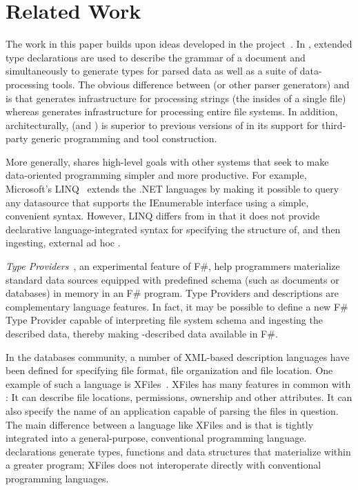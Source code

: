 \section{Related Work}
\label{sec:related}

The work in this paper builds upon ideas developed in the \pads{} 
project~\cite{fisher+:pads,fisher+:toplas}. In \pads{}, extended
type declarations are used to describe the grammar of a document
and simultaneously to generate types for parsed data as well as a suite 
of data-processing tools.  The obvious difference between 
\pads{} (or other parser generators) and
\forest{} is that 
\pads{} generates infrastructure for processing strings (the insides
of a single file) whereas \forest{} generates infrastructure for 
processing entire file systems.
In addition,
architecturally, \forest{} (and \padshaskell) is superior to 
previous versions of \pads{}
in its support for third-party generic programming and tool construction.

More generally, \forest{} shares high-level goals with other systems
that seek to make data-oriented programming simpler and more productive.
For example, Microsoft's LINQ~\cite{linq} extends the .NET languages
by making it possible to query 
any datasource that supports the IEnumerable interface using
a simple, convenient syntax.  However, LINQ
differs from \forest{} in that
it does not provide declarative 
language-integrated syntax for specifying the structure of, and then ingesting,
external ad hoc \filestores{}.

{\em Type Providers}~\cite{syme+:type-providers}, an experimental feature
of F\#, help programmers materialize standard data sources equipped with
predefined schema (such as \xml{} documents or databases) in memory in
an F\# program.  Type Providers and \forest{} descriptions
are complementary language
features.  In fact, it may be possible to define a new F\# Type Provider
capable of interpreting \forest{} file system schema and ingesting
the described data, thereby making \forest{}-described data available
in F\#.

In the databases community, a number of XML-based
description languages have been defined for specifying
file format, file organization and file location.
One example of such a language is XFiles~\cite{xml-file-sys}.
XFiles has many features in common with \forest{}:  It can
describe file locations, permissions, ownership and other
attributes.  It can also specify the name of an application capable of
parsing the files in question.  The main difference between
a language like XFiles and \forest{} is that \forest{} is
tightly integrated into a general-purpose, conventional programming
language.  \forest{} declarations generate types, functions
and data structures that materialize within
a greater \haskell{} program; XFiles 
does not interoperate directly with conventional programming languages.
